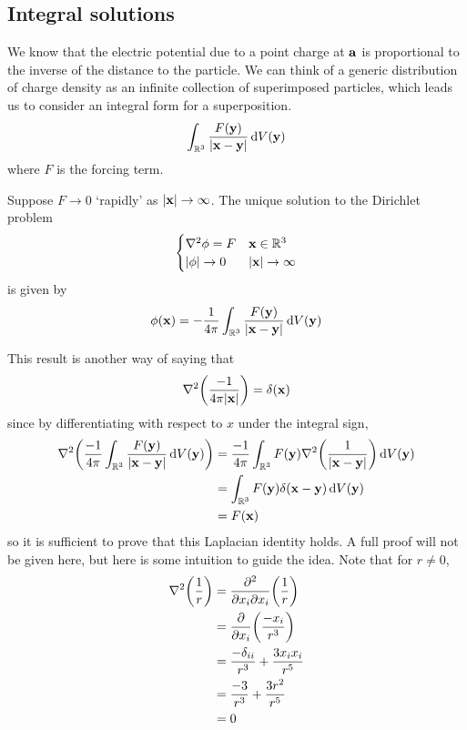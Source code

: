 \subsection{Integral solutions}
We know that the electric potential due to a point charge at \(\vb a\) is proportional to the inverse of the distance to the particle.
We can think of a generic distribution of charge density as an infinite collection of superimposed particles, which leads us to consider an integral form for a superposition.
\[
	\int_{\mathbb R^3} \frac{F(\vb y)}{\abs{\vb x - \vb y}} \dd{V(\vb y)}
\]
where \(F\) is the forcing term.
\begin{proposition}
	Suppose \(F \to 0\) `rapidly' as \(\abs{\vb x} \to \infty\).
	The unique solution to the Dirichlet problem
	\[
		\begin{cases}
			\laplacian{\phi} = F & \vb x \in \mathbb R^3   \\
			\abs{\phi} \to 0     & \abs{\vb{x}} \to \infty
		\end{cases}
	\]
	is given by
	\[
		\phi(\vb x) = -\frac{1}{4\pi}\int_{\mathbb R^3} \frac{F(\vb y)}{\abs{\vb x - \vb y}} \dd{V(\vb y)}
	\]
\end{proposition}
This result is another way of saying that
\[
	\laplacian(\frac{-1}{4\pi\abs{\vb x}}) = \delta(\vb x)
\]
since by differentiating with respect to \(x\) under the integral sign,
\begin{align*}
	\laplacian(\frac{-1}{4\pi} \int_{\mathbb R^3} \frac{F(\vb y)}{\abs{\vb x - \vb y}} \dd{V(\vb y)}) & = \frac{-1}{4\pi} \int_{\mathbb R^3} F(\vb y) \laplacian(\frac{1}{\abs{\vb x - \vb y}}) \dd{V(\vb y)} \\
	                                                                                                  & = \int_{\mathbb R^3} F(\vb y) \delta(\vb x - \vb y) \dd{V(\vb y)}                                     \\
	                                                                                                  & = F(\vb x)
\end{align*}
so it is sufficient to prove that this Laplacian identity holds.
A full proof will not be given here, but here is some intuition to guide the idea.
Note that for \(r \neq 0\),
\begin{align*}
	\laplacian(\frac{1}{r}) & = \pdv{}{x_i}{x_i} \qty(\frac{1}{r})              \\
	                        & = \pdv{x_i} \qty(\frac{-x_i}{r^3})                \\
	                        & = \frac{-\delta_{ii}}{r^3} + \frac{3x_i x_i}{r^5} \\
	                        & = \frac{-3}{r^3} + \frac{3r^2}{r^5}               \\
	                        & = 0
\end{align*}
